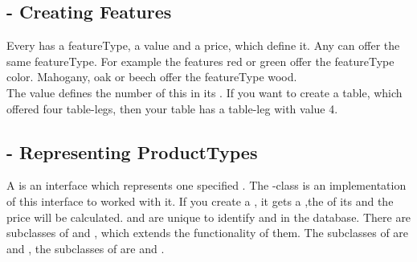 \subsection{ - Creating Features}
Every  has a featureType, a value and a price, which define it. Any {} can offer the same featureType. For example the features red or green 
offer the featureType color. Mahogany, oak or beech offer the featureType wood.\\
The value defines the number of this  in its . If you want to create a table, which offered four table-legs, then your table has a  
table-leg with value 4.   

\subsection{ - Representing ProductTypes}
A  is an interface which represents one specified . The -class is an implementation of this interface to worked with it.
If you create a , it gets a  ,the  of its  and the price will be calculated.
 and  are unique  to identify  and  in the database. 
There are subclasses of  and , which extends the functionality of them. The subclasses of  are  and 
, the subclasses of  are  and . 


